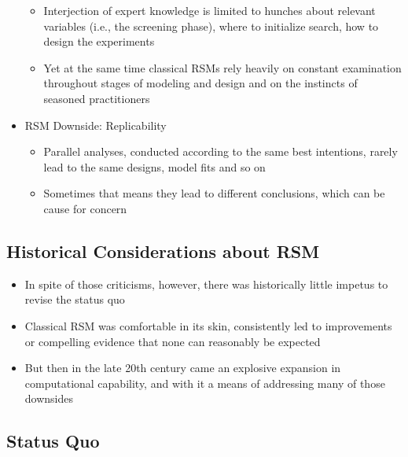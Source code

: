 \documentclass[
  letterpaper,
  DIV=11,
  numbers=noendperiod]{scrreprt}
\providecommand{\tightlist}{%
  \setlength{\itemsep}{0pt}\setlength{\parskip}{0pt}}\usepackage{longtable,booktabs,array}
\begin{document}
\begin{itemize}
  \begin{itemize}
  \tightlist
  \item
    Interjection of expert knowledge is limited to hunches about
    relevant variables (i.e., the screening phase), where to initialize
    search, how to design the experiments
  \item
    Yet at the same time classical RSMs rely heavily on constant
    examination throughout stages of modeling and design and on the
    instincts of seasoned practitioners
  \end{itemize}
\item
  RSM Downside: Replicability

  \begin{itemize}
  \tightlist
  \item
    Parallel analyses, conducted according to the same best intentions,
    rarely lead to the same designs, model fits and so on
  \item
    Sometimes that means they lead to different conclusions, which can
    be cause for concern
  \end{itemize}
\end{itemize}

\subsection{Historical Considerations about
RSM}\label{historical-considerations-about-rsm}

\begin{itemize}
\tightlist
\item
  In spite of those criticisms, however, there was historically little
  impetus to revise the status quo
\item
  Classical RSM was comfortable in its skin, consistently led to
  improvements or compelling evidence that none can reasonably be
  expected
\item
  But then in the late 20th century came an explosive expansion in
  computational capability, and with it a means of addressing many of
  those downsides
\end{itemize}

\subsection{Status Quo}\label{status-quo}
\end{document}
